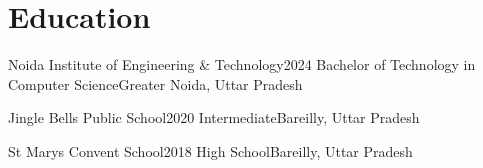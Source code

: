 \section{Education}
\resumeSubHeadingListStart

    \resumeSubheading
    {Noida Institute of Engineering \& Technology}{2024}
    {Bachelor of Technology in Computer Science}{Greater Noida, Uttar Pradesh}
    
    \resumeSubheading
    {Jingle Bells Public School}{2020}
    {Intermediate}{Bareilly, Uttar Pradesh}

    \resumeSubheading
    {St Marys Convent School}{2018}
    {High School}{Bareilly, Uttar Pradesh}

\resumeSubHeadingListEnd

